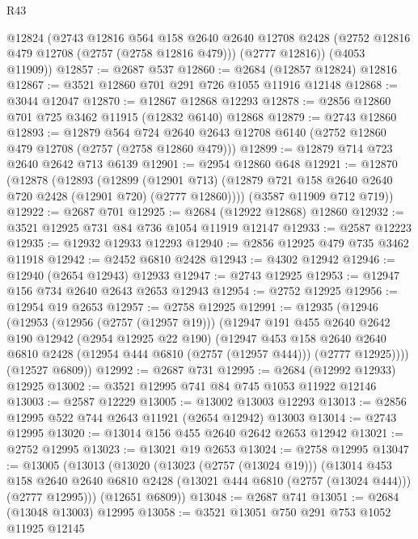 \begin{lexlean}{R43}
\begin{coremodule}
      @12824
      (@2743
        @12816
        @564
        @158
        @2640
        @2640
        @12708
        @2428
        (@2752 @12816 @479 @12708 (@2757 (@2758 @12816 @479)))
        (@2777 @12816))
      (@4053 @11909))
@12857 := @2687 @537
@12860 := @2684 (@12857 @12824) @12816
@12867 := @3521 @12860 @701 @291 @726 @1055 @11916 @12148
@12868 := @3044 @12047
@12870 := @12867 @12868 @12293
@12878 := @2856 @12860 @701 @725 @3462 @11915 (@12832 @6140) @12868
@12879 := @2743 @12860
@12893 := @12879
    @564
    @724
    @2640
    @2643
    @12708
    @6140
    (@2752 @12860 @479 @12708 (@2757 (@2758 @12860 @479)))
@12899 := @12879 @714 @723 @2640 @2642 @713 @6139
@12901 := @2954 @12860 @648
@12921 := @12870
    (@12878
      (@12893
        (@12899
          (@12901 @713)
          (@12879 @721 @158 @2640 @2640 @720 @2428 (@12901 @720) (@2777 @12860))))
      (@3587 @11909 @712 @719))
@12922 := @2687 @701
@12925 := @2684 (@12922 @12868) @12860
@12932 := @3521 @12925 @731 @84 @736 @1054 @11919 @12147
@12933 := @2587 @12223
@12935 := @12932 @12933 @12293
@12940 := @2856 @12925 @479 @735 @3462 @11918
@12942 := @2452 @6810 @2428
@12943 := @4302 @12942
@12946 := @12940 (@2654 @12943) @12933
@12947 := @2743 @12925
@12953 := @12947 @156 @734 @2640 @2643 @2653 @12943
@12954 := @2752 @12925
@12956 := @12954 @19 @2653
@12957 := @2758 @12925
@12991 := @12935
    (@12946
      (@12953
        (@12956 (@2757 (@12957 @19)))
        (@12947
          @191
          @455
          @2640
          @2642
          @190
          @12942
          (@2954 @12925 @22 @190)
          (@12947
            @453
            @158
            @2640
            @2640
            @6810
            @2428
            (@12954 @444 @6810 (@2757 (@12957 @444)))
            (@2777 @12925))))
      (@12527 @6809))
@12992 := @2687 @731
@12995 := @2684 (@12992 @12933) @12925
@13002 := @3521 @12995 @741 @84 @745 @1053 @11922 @12146
@13003 := @2587 @12229
@13005 := @13002 @13003 @12293
@13013 := @2856 @12995 @522 @744 @2643 @11921 (@2654 @12942) @13003
@13014 := @2743 @12995
@13020 := @13014 @156 @455 @2640 @2642 @2653 @12942
@13021 := @2752 @12995
@13023 := @13021 @19 @2653
@13024 := @2758 @12995
@13047 := @13005
    (@13013
      (@13020
        (@13023 (@2757 (@13024 @19)))
        (@13014
          @453
          @158
          @2640
          @2640
          @6810
          @2428
          (@13021 @444 @6810 (@2757 (@13024 @444)))
          (@2777 @12995)))
      (@12651 @6809))
@13048 := @2687 @741
@13051 := @2684 (@13048 @13003) @12995
@13058 := @3521 @13051 @750 @291 @753 @1052 @11925 @12145

\end{coremodule}
\end{lexlean}
